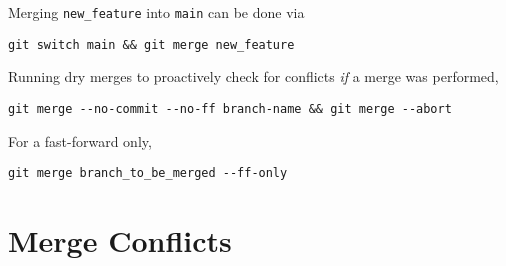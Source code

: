 \documentclass[12pt, a4paper]{scrbook}
\numberwithin{equation}{section}
\theoremstyle{definition}
\theoremstyle{definition}
\begin{document}
		Merging \texttt{new\_feature} into \texttt{main} can be done via
		
		\begin{lstlisting}[style=mystylebash, label=alg:merging1, xleftmargin=\parindent]
			git switch main && git merge new_feature
		\end{lstlisting}
	
		Running dry merges to proactively check for conflicts \textit{if} a merge was performed,
		
		\begin{lstlisting}[style=mystylebash, label=alg:git__dry_merge, xleftmargin=\parindent]
			git merge --no-commit --no-ff branch-name && git merge --abort
		\end{lstlisting}
		
		For a fast-forward only,
		
		\begin{lstlisting}[style=mystylebash, label=alg:git__ff_only, xleftmargin=\parindent]
			git merge branch_to_be_merged --ff-only
		\end{lstlisting}
	
	
	\section{Merge Conflicts}
	
\end{document}
